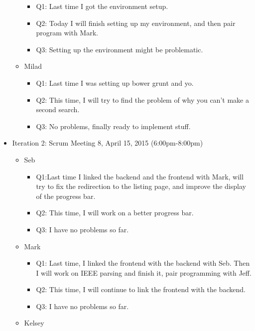 \documentclass[]{article}
\begin{document}
\begin{itemize}
\begin{itemize}
    \begin{itemize}
    \itemsep1pt\parskip0pt
    \item
      Q1: Last time I got the environment setup.
    \item
      Q2: Today I will finish setting up my environment, and then pair
      program with Mark.
    \item
      Q3: Setting up the environment might be problematic.
    \end{itemize}
  \item
    Milad

    \begin{itemize}
    \itemsep1pt\parskip0pt
    \item
      Q1: Last time I was setting up bower grunt and yo.
    \item
      Q2: This time, I will try to find the problem of why you can't
      make a second search.
    \item
      Q3: No problems, finally ready to implement stuff.
    \end{itemize}
  \end{itemize}
\item
  Iteration 2: Scrum Meeting 8, April 15, 2015 (6:00pm-8:00pm)

  \begin{itemize}
  \itemsep1pt\parskip0pt
  \item
    Seb

    \begin{itemize}
    \itemsep1pt\parskip0pt
    \item
      Q1:Last time I linked the backend and the frontend with Mark, will
      try to fix the redirection to the listing page, and improve the
      display of the progress bar.
    \item
      Q2: This time, I will work on a better progress bar.
    \item
      Q3: I have no problems so far.
    \end{itemize}
  \item
    Mark

    \begin{itemize}
    \itemsep1pt\parskip0pt
    \item
      Q1: Last time, I linked the frontend with the backend with Seb.
      Then I will work on IEEE parsing and finish it, pair programming
      with Jeff.
    \item
      Q2: This time, I will continue to link the frontend with the
      backend.
    \item
      Q3: I have no problems so far.
    \end{itemize}
  \item
    Kelsey


\end{itemize}
\end{itemize}
\end{document}
